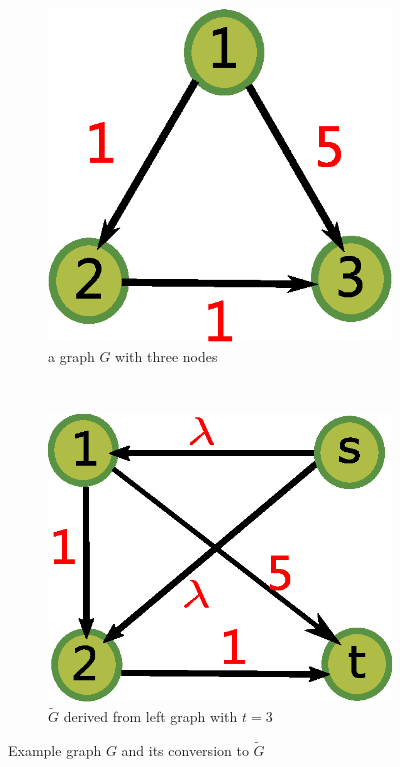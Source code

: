 \documentclass{article}
\begin{document}
\begin{figure}
	\centering
	\begin{subfigure}{0.33\textwidth}
		\includegraphics[width=\textwidth]{pic/example_directed.eps}
		\caption{a graph $G$ with three nodes}\label{fig:tn}
	\end{subfigure}~
	\begin{subfigure}{0.36\textwidth}
		\includegraphics[width=\textwidth]{pic/example_st.eps}
		\caption{$\widetilde{G}$ derived from left graph with $t=3$}\label{fig:tn_converted}
	\end{subfigure}
	\caption{Example graph $G$ and its conversion to $\widetilde{G}$}
\end{figure}
\end{document}
